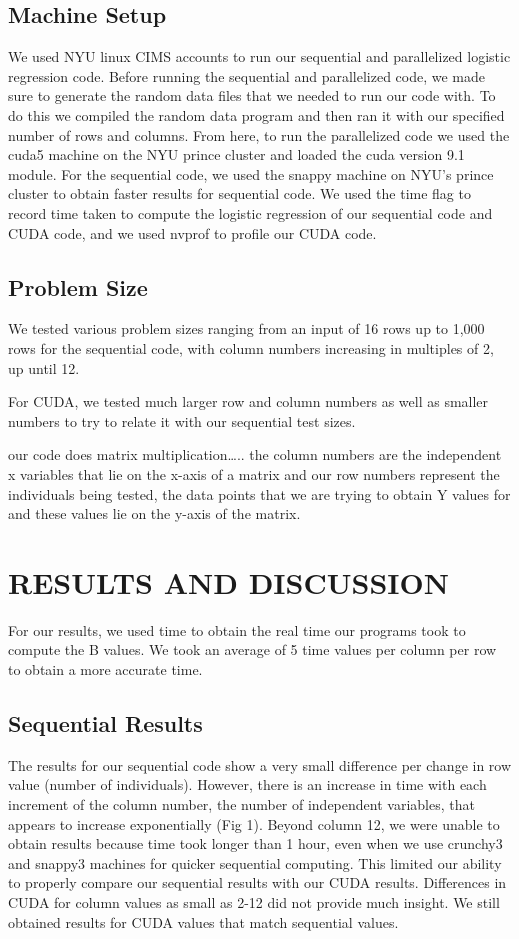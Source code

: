 \documentclass[letterpaper, 10 pt, conference]{ieeeconf}  %
\begin{document}
\subsection{Machine Setup}

We used NYU linux CIMS accounts to run our sequential and parallelized logistic regression code. Before running the sequential and parallelized code, we made sure to generate the random data files that we needed to run our code with. To do this we compiled the random data program and then ran it with our specified number of rows and columns. From here, to run the parallelized code we used the cuda5 machine on the NYU prince cluster and loaded the cuda version 9.1 module. For the sequential code, we used the snappy machine on NYU’s prince cluster to obtain faster results for sequential code. We used the time flag to record time taken to compute the logistic regression of our sequential code and CUDA code, and we used nvprof to profile our CUDA code. 


\subsection{Problem Size}
We tested various problem sizes ranging from an input of 16 rows up to 1,000 rows for the sequential code, with column numbers increasing in multiples of 2, up until 12. 

For CUDA, we tested much larger row and column numbers as well as smaller numbers to try to relate it with our sequential test sizes.

our code does matrix multiplication….. the column numbers are the independent x variables that lie on the x-axis of a matrix and our row numbers represent the individuals being tested, the data points that we are trying to obtain Y values for and these values lie on the y-axis of the matrix. 



\section{RESULTS AND DISCUSSION}

For our results, we used time to obtain the real time our programs took to compute the B values. We took an average of 5 time values per column per row to obtain a more accurate time.

\subsection{Sequential Results}
The results for our sequential code show a very small difference per change in row value (number of individuals). However, there is an increase in time with each increment of the column number, the number of independent variables, that appears to increase exponentially (Fig 1). Beyond column 12, we were unable to obtain results because time took longer than 1 hour, even when we use crunchy3 and snappy3 machines for quicker sequential computing. This limited our ability to properly compare our sequential results with our CUDA results. Differences in CUDA for column values as small as 2-12 did not provide much insight. We still obtained results for CUDA values that match sequential values. 
\end{document}
